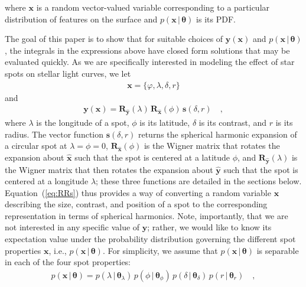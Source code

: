 \documentclass[modern]{aastex62}
\begin{document}
%
where $\mathbf{x}$ is a random vector-valued variable corresponding to a particular
distribution of features on the surface and
$p(\mathbf{x} \, \big| \, \pmb{\theta})$ is its PDF.

The goal of this paper is to show that for suitable choices of $\mathbf{y}(\mathbf{x})$
and $p(\mathbf{x} \, \big| \, \pmb{\theta})$, the integrals in the expressions
above have closed form solutions that may be evaluated quickly.
%
As we are specifically interested in modeling the effect of star spots
on stellar light curves, we let
%
\begin{align}
    \mathbf{x} = \big\{ \varphi, \lambda, \delta, r \big\}
\end{align}
%
and
%
\begin{align}
    \label{eq:RRs}
    \mathbf{y}(\mathbf{x}) =
    \mathbf{R}_{\hat{\mathbf{y}}}(\lambda)
    \,
    \mathbf{R}_{\hat{\mathbf{x}}}(\phi)
    \,
    \mathbf{s}(\delta, r)
    \quad,
\end{align}
%
where $\lambda$ is the longitude of a spot, $\phi$ is its latitude, $\delta$
is its contrast, and $r$ is its radius. The vector function $\mathbf{s}(\delta, r)$
returns the spherical harmonic expansion of a circular spot at $\lambda = \phi = 0$,
$\mathbf{R}_{\hat{\mathbf{x}}}(\phi)$ is the Wigner matrix that rotates the
expansion about $\hat{\mathbf{x}}$ such that the spot is centered at a
latitude $\phi$, and $\mathbf{R}_{\hat{\mathbf{y}}}(\lambda)$ is the Wigner
matrix that then rotates the
expansion about $\hat{\mathbf{y}}$ such that the spot is centered at a
longitude $\lambda$; these three functions are detailed in the sections below.
%
Equation~(\ref{eq:RRs}) thus provides a way of converting a random variable
$\mathbf{x}$ describing the size, contrast, and position of a spot to the
corresponding representation in terms of spherical harmonics.
%
Note, importantly, that we are not interested in any specific value of
$\mathbf{y}$; rather, we would like to know its expectation value under
the probability distribution governing the different spot properties $\mathbf{x}$,
i.e., $p(\mathbf{x} \, \big| \, \pmb{\theta})$.
%
For simplicity, we assume that $p(\mathbf{x} \, \big| \, \pmb{\theta})$
is separable in each of the four spot properties:
%
\begin{align}
    p(\mathbf{x} \, \big| \, \pmb{\theta})
    =
    p(\lambda \, \big| \, \pmb{\theta}_{\lambda}) \,
    p(\phi \, \big| \, \pmb{\theta}_{\phi})\,
    p(\delta \, \big| \, \pmb{\theta}_{\delta}) \,
    p(r \, \big| \, \pmb{\theta}_{r})
    \quad,
\end{align}
\end{document}
